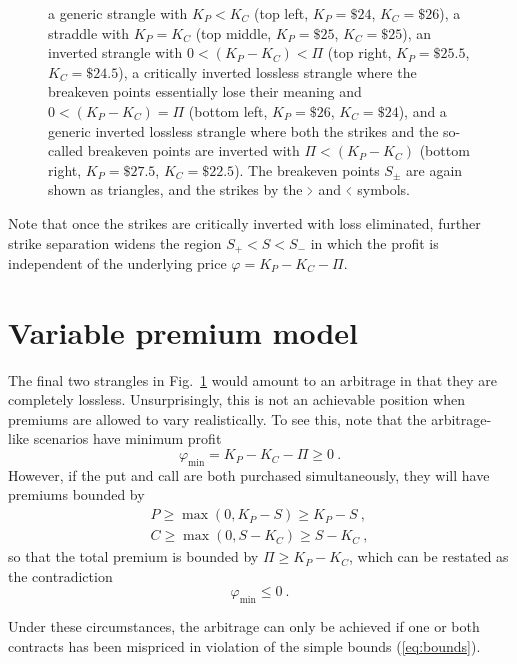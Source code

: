 \documentclass[aps,reprint]{revtex4-2}
\begin{document}
\begin{figure}[htb]
{    a generic strangle with $K_P < K_C$ (top left, $K_P=\$24$, $K_C=\$26$),
    a straddle with $K_P = K_C$ (top middle, $K_P=\$25$, $K_C=\$25$),
    an inverted strangle with $0 < (K_P - K_C) < \Pi$ (top right, $K_P=\$25.5$, $K_C=\$24.5$),
    a critically inverted lossless strangle where the breakeven points essentially lose their meaning and $0 < (K_P - K_C) = \Pi$ (bottom left, $K_P=\$26$, $K_C=\$24$),
    and a generic inverted lossless strangle where both the strikes and the so-called breakeven points are inverted with $\Pi < (K_P - K_C)$ (bottom right, $K_P=\$27.5$, $K_C=\$22.5$). 
    The breakeven points $S_\pm$ are again shown as triangles, and the strikes by the $ \scalebox{0.5}[1]{$>$} $ and $\scalebox{0.5}[1]{$<$}$ symbols.
}
    \label{fig:sequence}
\end{figure}
Note that once the strikes are critically inverted with loss eliminated, further strike separation widens the region $S_+ < S < S_-$ in which the profit is independent of the underlying price $\varphi = K_P - K_C - \Pi$.

\section{Variable premium model}

The final two strangles in Fig.~\ref{fig:sequence} would amount to an arbitrage in that they are completely lossless.  Unsurprisingly, this is not an achievable position when premiums are allowed to vary realistically.  To see this, note that the arbitrage-like scenarios have minimum profit
\begin{equation}
\varphi_{\min} = K_P - K_C - \Pi \geq 0~.
\end{equation}
However, if the put and call are both purchased simultaneously, they will have premiums bounded by 
\begin{subequations} \label{eq:bounds}
\begin{align}
P \geq \max(0, K_P - S) \geq K_P - S~,\\
C \geq \max(0, S - K_C) \geq S - K_C~,
\end{align}
\end{subequations}
so that the total premium is bounded by $\Pi \geq K_P - K_C$, which can be restated as the contradiction
\begin{equation}
\varphi_{\min} \leq 0~.
\end{equation}

Under these circumstances, the arbitrage can only be achieved if one or both contracts has been mispriced in violation of the simple bounds (\ref{eq:bounds}).  
\end{document}
